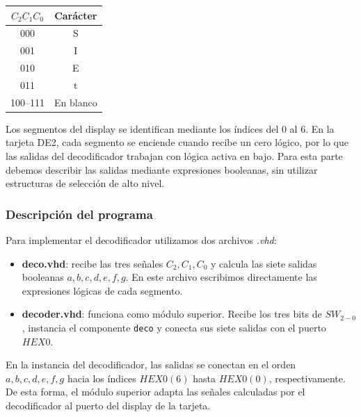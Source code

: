 \documentclass[12pt]{report}
\begin{document}
\begin{center}
\begin{tabular}{|c|c|}
\hline
$C_2C_1C_0$ & Carácter \\
\hline
000 & S \\
001 & I \\
010 & E \\
011 & t \\
100--111 & En blanco \\
\hline
\end{tabular}
\end{center}

Los segmentos del display se identifican mediante los índices del 0 al 6. En la tarjeta DE2, cada segmento se enciende cuando recibe un cero lógico, por lo que las salidas del decodificador trabajan con lógica activa en bajo. Para esta parte debemos describir las salidas mediante expresiones booleanas, sin utilizar estructuras de selección de alto nivel.

\subsubsection*{Descripción del programa}
Para implementar el decodificador utilizamos dos archivos \textit{.vhd}:

\begin{itemize}
    \item \textbf{deco.vhd}: recibe las tres señales $C_2,C_1,C_0$ y calcula las siete salidas booleanas $a,b,c,d,e,f,g$. En este archivo escribimos directamente las expresiones lógicas de cada segmento.
    \item \textbf{decoder.vhd}: funciona como módulo superior. Recibe los tres bits de $SW_{2-0}$, instancia el componente \texttt{deco} y conecta sus siete salidas con el puerto $HEX0$.
\end{itemize}

En la instancia del decodificador, las salidas se conectan en el orden $a,b,c,d,e,f,g$ hacia los índices $HEX0(6)$ hasta $HEX0(0)$, respectivamente. De esta forma, el módulo superior adapta las señales calculadas por el decodificador al puerto del display de la tarjeta.

\end{document}
